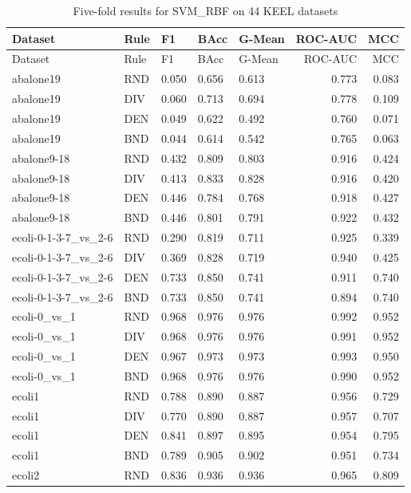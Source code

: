 \documentclass[10pt,a4paper]{article}
\begin{document}
\begingroup\small\setlength{\tabcolsep}{4pt}
\begin{longtable}{lllllrr}
\caption{Five-fold results for SVM\_RBF on 44 KEEL datasets}\label{tab:s1}\\
\toprule
Dataset & Rule & F1 & BAcc & G-Mean & ROC-AUC & MCC \\
\midrule
\endfirsthead
\toprule
Dataset & Rule & F1 & BAcc & G-Mean & ROC-AUC & MCC \\
\midrule
\endhead
\bottomrule
\endlastfoot
abalone19 & RND & 0.050 & 0.656 & 0.613 & 0.773 & 0.083 \\
abalone19 & DIV & 0.060 & 0.713 & 0.694 & 0.778 & 0.109 \\
abalone19 & DEN & 0.049 & 0.622 & 0.492 & 0.760 & 0.071 \\
abalone19 & BND & 0.044 & 0.614 & 0.542 & 0.765 & 0.063 \\
abalone9-18 & RND & 0.432 & 0.809 & 0.803 & 0.916 & 0.424 \\
abalone9-18 & DIV & 0.413 & 0.833 & 0.828 & 0.916 & 0.420 \\
abalone9-18 & DEN & 0.446 & 0.784 & 0.768 & 0.918 & 0.427 \\
abalone9-18 & BND & 0.446 & 0.801 & 0.791 & 0.922 & 0.432 \\
ecoli-0-1-3-7\_vs\_2-6 & RND & 0.290 & 0.819 & 0.711 & 0.925 & 0.339 \\
ecoli-0-1-3-7\_vs\_2-6 & DIV & 0.369 & 0.828 & 0.719 & 0.940 & 0.425 \\
ecoli-0-1-3-7\_vs\_2-6 & DEN & 0.733 & 0.850 & 0.741 & 0.911 & 0.740 \\
ecoli-0-1-3-7\_vs\_2-6 & BND & 0.733 & 0.850 & 0.741 & 0.894 & 0.740 \\
ecoli-0\_vs\_1 & RND & 0.968 & 0.976 & 0.976 & 0.992 & 0.952 \\
ecoli-0\_vs\_1 & DIV & 0.968 & 0.976 & 0.976 & 0.991 & 0.952 \\
ecoli-0\_vs\_1 & DEN & 0.967 & 0.973 & 0.973 & 0.993 & 0.950 \\
ecoli-0\_vs\_1 & BND & 0.968 & 0.976 & 0.976 & 0.990 & 0.952 \\
ecoli1 & RND & 0.788 & 0.890 & 0.887 & 0.956 & 0.729 \\
ecoli1 & DIV & 0.770 & 0.890 & 0.887 & 0.957 & 0.707 \\
ecoli1 & DEN & 0.841 & 0.897 & 0.895 & 0.954 & 0.795 \\
ecoli1 & BND & 0.789 & 0.905 & 0.902 & 0.951 & 0.734 \\
ecoli2 & RND & 0.836 & 0.936 & 0.936 & 0.965 & 0.809 \\

\end{longtable}
\end{document}

